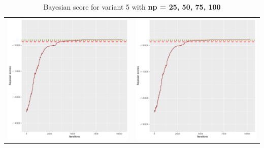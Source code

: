 \documentclass[]{scrartcl}
\begin{document}
\begin{table}[h!]
\begin{tabular}{cc}
\includegraphics[scale = 0.4]{./figs/hepar2/v5/75/bayBoundsEvolution-10352.pdf} & 
\includegraphics[scale = 0.4]{./figs/hepar2/v5/100/bayBoundsEvolution-10352.pdf} \\
\end{tabular}
\caption{Bayesian score for variant 5 with \textbf{np =  25, 50, 75, 100}}
\end{table}
\end{document}
